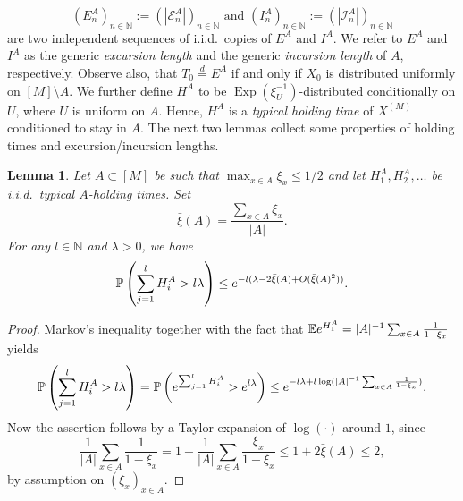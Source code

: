 \documentclass[11pt,a4paper]{scrartcl}
\numberwithin{equation}{section}
\theoremstyle{plain}
\newtheorem{lemma}[theorem]{Lemma}
\theoremstyle{definition}
\theoremstyle{remark}
\newcommand{\bE}{\ensuremath{\mathbb{E}}}
\newcommand{\bN}{\ensuremath{\mathbb{N}}}
\newcommand{\bP}{\ensuremath{\mathbb{P}}}
\begin{document}
$$
({E}^A_n)_{n\in\bN}:=(|\mathcal{E}^A_n|)_{n\in\bN} \text{ and } ({I}^A_n)_{n\in\bN}:=(|\mathcal{I}^A_n|)_{n\in\bN}
$$
are two independent sequences of i.i.d.\ copies of $E^A$ and $I^A$. We refer to $E^A$ and $I^A$ as the generic \emph{excursion length} and the generic \emph{incursion length} of $A$, respectively.  Observe also, that $T_0\overset{d}{=}E^A$ if and only if $X_0$ is distributed uniformly on $[M]\setminus A$. We further define $H^{A}$ to be $\operatorname{Exp}(\xi_U^{-1})$-distributed conditionally on $U$, where $U$ is uniform on $A$. Hence, $H^{A}$ is a \emph{typical holding time} of $X^{(M)}$ conditioned to stay in $A$. The next two lemmas collect some properties of holding times and excursion/incursion lengths.
\begin{lemma}\label{lem:LD_holding}
Let $A\subset[M]$ be such that $\max_{x\in A}\xi_x\leq 1/2$ and let $H^A_1,H^A_2,\dots$ be i.i.d.\ typical $A$-holding times. Set
\[
\bar\xi(A)=\frac{\sum_{x\in A}\xi_x}{|A|}.
\]
For any $l\in\bN$ and $\lambda>0$, we have
\[
\bP\left(\sum_{j=1}^l H^A_i>l\lambda\right)\leq \textup{e}^{-l(\lambda-2\bar{\xi}(A)+O(\bar{\xi}(A)^2))}.
\]
\end{lemma}
\begin{proof}
Markov's inequality together with the fact that $\bE \textup{e}^{H^A_1}=|A|^{-1}\sum_{x\in A}\frac{1}{1-\xi_x}$ yields
\[
\bP\left(\sum_{j=1}^l H^A_i>l\lambda\right)=\bP\left(\textup{e}^{\sum_{j=1}^l H^A_i}>\textup{e}^{l\lambda}\right)\leq \textup{e}^{-l\lambda + l \log(|A|^{-1}\sum_{x\in A}\frac{1}{1-\xi_x})}.
\]
Now the assertion follows by a Taylor expansion of $\log(\cdot)$ around $1$, since
\begin{equation}\label{eq:xibound}
\frac{1}{|A|}\sum_{x\in A}\frac{1}{1-\xi_x}=1+\frac{1}{|A|}\sum_{x\in A}\frac{\xi_x}{1-\xi_x}\leq 1+2\bar{\xi}(A)\leq2,
\end{equation}
by assumption on $(\xi_x)_{x\in A}$.
\end{proof}
\end{document}
